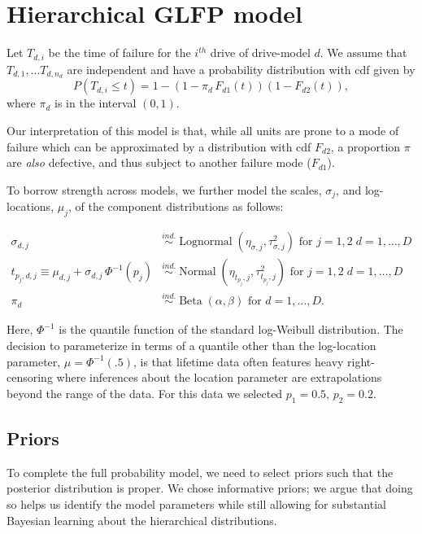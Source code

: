 \documentclass{article}
\newcommand{\ind}{\stackrel{ind.}{\sim}}
\newcommand{\op}{\operatorname}
\begin{document}
\section{Hierarchical GLFP model}
Let $T_{d,i}$ be the time of failure for the $i^{th}$ drive of drive-model $d$.
We assume that $T_{d,1},\ldots T_{d,n_d}$ are independent and have a probability distribution with cdf given by
\begin{equation*}
P(T_{d,i}\le t) = 1 - (1-\pi_d\, F_{d1}(t))(1 - F_{d2}(t)),
\end{equation*}
where $\pi_d$ is in the interval $(0,1)$.

Our interpretation of this model is that, while all units are prone to a mode of failure which can be approximated by a distribution with cdf $F_{d2}$, a proportion $\pi$ are {\em also} defective, and thus subject to another failure mode ($F_{d1}$).

To borrow strength across models, we further model the scales, $\sigma_j$, and log-locations, $\mu_j$, of the component distributions as follows:

\begin{align*}
\sigma_{d,j} &\ind \op{Lognormal} \left( \eta_{\sigma,j}, \tau^2_{\sigma,j} \right) \mbox{ for } j=1,2\; d=1,\ldots,D\\
t_{p_j,d,j} \equiv \mu_{d,j} + \sigma_{d,j}\,\Phi^{-1}(p_j) & \ind \op{Normal} \left(\eta_{t_{p_j},j}, \tau^2_{t_{p_j},j}\right) \mbox{ for } j=1,2\; d=1,\ldots,D\\
\pi_d &\ind \op{Beta}(\alpha, \beta) \mbox{ for } d=1,\ldots,D.
\end{align*}

Here, $\Phi^{-1}$ is the quantile function of the standard log-Weibull distribution. The decision to parameterize in terms of a quantile other than the log-location parameter, $\mu = \Phi^{-1}(.5)$, is that lifetime data often features heavy right-censoring where inferences about the location parameter are extrapolations beyond the range of the data. For this data we selected $p_1=0.5,\, p_2 = 0.2$.

\subsection{Priors}
To complete the full probability model, we need to select priors such that the posterior distribution is proper. We chose informative priors; we argue that doing so helps us identify the model parameters while still allowing for substantial Bayesian learning about the hierarchical distributions.
\end{document}
